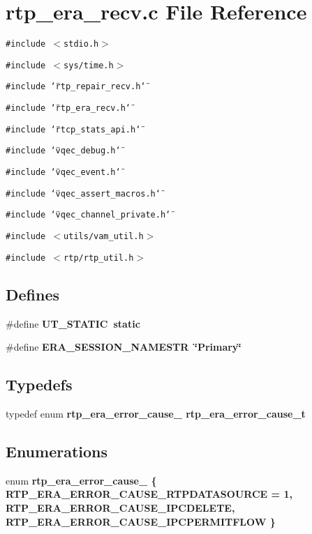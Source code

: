 \section{rtp\_\-era\_\-recv.c File Reference}
\label{rtp__era__recv_8c}
{\tt \#include $<$stdio.h$>$}\par
{\tt \#include $<$sys/time.h$>$}\par
{\tt \#include \char`\"{}rtp\_\-repair\_\-recv.h\char`\"{}}\par
{\tt \#include \char`\"{}rtp\_\-era\_\-recv.h\char`\"{}}\par
{\tt \#include \char`\"{}rtcp\_\-stats\_\-api.h\char`\"{}}\par
{\tt \#include \char`\"{}vqec\_\-debug.h\char`\"{}}\par
{\tt \#include \char`\"{}vqec\_\-event.h\char`\"{}}\par
{\tt \#include \char`\"{}vqec\_\-assert\_\-macros.h\char`\"{}}\par
{\tt \#include \char`\"{}vqec\_\-channel\_\-private.h\char`\"{}}\par
{\tt \#include $<$utils/vam\_\-util.h$>$}\par
{\tt \#include $<$rtp/rtp\_\-util.h$>$}\par
\subsection*{Defines}
\begin{CompactItemize}
\item 
\#define \bf{UT\_\-STATIC}~static
\item 
\#define \bf{ERA\_\-SESSION\_\-NAMESTR}~\char`\"{}Primary\char`\"{}
\end{CompactItemize}
\subsection*{Typedefs}
\begin{CompactItemize}
\item 
typedef enum \bf{rtp\_\-era\_\-error\_\-cause\_\-} \bf{rtp\_\-era\_\-error\_\-cause\_\-t}
\end{CompactItemize}
\subsection*{Enumerations}
\begin{CompactItemize}
\item 
enum \bf{rtp\_\-era\_\-error\_\-cause\_\-} \{ \bf{RTP\_\-ERA\_\-ERROR\_\-CAUSE\_\-RTPDATASOURCE} =  1, 
\bf{RTP\_\-ERA\_\-ERROR\_\-CAUSE\_\-IPCDELETE}, 
\bf{RTP\_\-ERA\_\-ERROR\_\-CAUSE\_\-IPCPERMITFLOW}
 \}
\end{CompactItemize}
